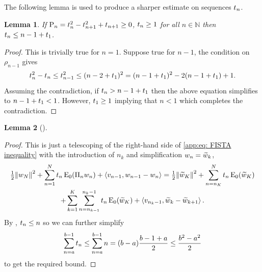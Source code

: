 \documentclass[10pt,a4paper,onecolumn]{article}
\numberwithin{equation}{section}
\newtheorem{lemma}{Lemma}[section]\newtheorem{example}{Example}[section]
\let\F\mathds\let\C\mathcal\newcommand{\R}{\F{R}}\newcommand{\A}{\C{A}}
\newcommand{\norm}[1]{{\left\lVert #1 \right\rVert}}
\newcommand{\IP}[2]{\left\langle #1,#2 \right\rangle}\newcommand{\ip}[2]{#1 \vcenter{\hbox{\resizebox{6pt}{!}{\ensuremath\cdot}}} #2}
\newcommand{\op}[1]{\operatorname{#1}}\newcommand{\overtext}[2]{\stackrel{\text{#1}}{#2}}
\newcommand*{\Func}[1]{%
	\IfEqCase{#1}{%
		{0}{\op{E}}%
		{1}{\op{F}}%
		{2}{\op{G}}%
		{3}{\op{H}}%
	}[\op{F}#1]%
}
\newcommand*{\varf}[1]{%
	\IfEqCase{#1}{%
		{0}{u}%
		{1}{v}%
		{2}{w}%
	}[u#1]%
}
\newcommand*{\vart}[1]{%
	\IfEqCase{#1}{%
		{0}{s}%
		{1}{t}%
	}[t#1]%
}
\newcommand*{\vars}[1]{%
	\IfEqCase{#1}{%
		{0}{\alpha}%
		{1}{\beta}%
		{2}{\gamma}%
		{3}{a}%
		{4}{b}%
		{5}{c}%
	}[k#1]%
}
\begin{document}
\newpage\noindent The following lemma is used to produce a sharper estimate on sequences $\vart1_n$.
\begin{lemma}\label{app: tn upper bound}
	If $\rho_n=\vart1_{n}^2-\vart1_{n+1}^2+\vart1_{n+1}\geq0$, $\vart1_n\geq 1$ for all $n\in\F N$ then $\vart1_n\leq n-1 +\vart1_1$.
\end{lemma}
\begin{proof}
	This is trivially true for $n=1$. Suppose true for $n-1$, the condition on $\rho_{n-1}$ gives
	\begin{equation}
		\vart1_n^2 -\vart1_n \leq \vart1_{n-1}^2 \leq (n-2+\vart1_1)^2 = (n-1+\vart1_1)^2 -2(n-1+\vart1_1) + 1.
	\end{equation}
	Assuming the contradiction, if $\vart1_n> n-1+\vart1_1$ then the above equation simplifies to $n-1+\vart1_1 < 1$. However, $\vart1_1\geq 1$ implying that $n<1$ which completes the contradiction.
\end{proof}



\begin{lemma}[]\label{app:thm: mini exponential FISTA convergence}
\end{lemma}
\begin{proof}
	This is just a telescoping of the right-hand side of \eqref{app:eq: FISTA inequality} with the introduction of $n_k$ and simplification $\varf2_n = \tilde{\varf2}_k$,
	\begin{multline}
		\tfrac12\norm{\varf2_N}^2 + \sum^N_{n=1} \vart1_n\Func0_0(\Pi_n\varf2_n) + \IP{\varf1_{n-1}}{\varf2_{n-1}-\varf2_n} = \tfrac12\norm{\tilde{\varf2}_K}^2 + \sum_{n=n_K}^N\vart1_n\Func0_0(\tilde{\varf2}_K) 
		\\+ \sum_{k=1}^K\sum_{n=n_{k-1}}^{n_k-1}\vart1_n\Func0_0(\tilde{\varf2}_K) 
		+ \IP{\varf1_{n_k-1}}{\tilde{\varf2}_k-\tilde{\varf2}_{k+1}}.
	\end{multline}
	By , $\vart1_n\leq n$ so we can further simplify
	$$\sum_{n=\vars3}^{\vars4-1}\vart1_n \leq \sum_{n=\vars3}^{\vars4-1}n = (\vars4-\vars3)\frac{\vars4-1+\vars3}{2} \leq \frac{\vars4^2-\vars3^2}{2}$$
	to get the required bound.
\end{proof}
\end{document}
